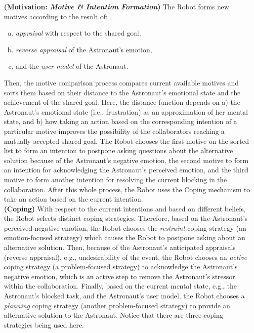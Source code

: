 \noindent \textbf{(Motivation: \textit{Motive \& Intention Formation})}
The Robot forms new motives according to the result of:

\begin{enumerate}[a)]
  \item \textit{appraisal} with respect to the shared goal,
  \item \textit{reverse appraisal} of the Astronaut's emotion,
  \item and the \textit{user model} of the Astronaut.
\end{enumerate}

Then, the motive comparison process compares current available motives and
sorts them based on their distance to the Astronaut's emotional state and
the achievement of the shared goal. Here, the distance function depends on a)
the Astronaut's emotional state (i.e., frustration) as an approximation of her
mental state, and b) how taking an action based on the corresponding intention
of a particular motive improves the possibility of the collaborators reaching a
mutually accepted shared goal. The Robot chooses the first motive on the sorted
list to form an intention to postpone asking questions about the alternative
solution because of the Astronaut's negative emotion, the second motive to form
an intention for acknowledging the Astronaut's perceived emotion, and the third
motive to form another intention for resolving the current blocking in the
collaboration. After this whole process, the Robot uses the Coping mechanism to
take an action based on the current intention.\\

\noindent \textbf{(Coping)} With respect to the current intentions and based on
different beliefs, the Robot selects distinct coping strategies. Therefore,
based on the Astronaut's perceived negative emotion, the Robot chooses the
\textit{restraint} coping strategy (an emotion-focused strategy) which causes
the Robot to postpone asking about an alternative solution. Then, because of the
Astronaut's anticipated appraisals (reverse appraisal), e.g., undesirability of
the event, the Robot chooses an \textit{active} coping strategy (a
problem-focused strategy) to acknowledge the Astronaut's negative emotion, which
is an active step to remove the Astronaut's stressor within the collaboration.
Finally, based on the current mental state, e.g., the Astronaut's blocked task,
and the Astronaut's user model, the Robot chooses a \textit{planning} coping
strategy (another problem-focused strategy) to provide an alternative solution
to the Astronaut. Notice that there are three coping strategies being used
here.\\

